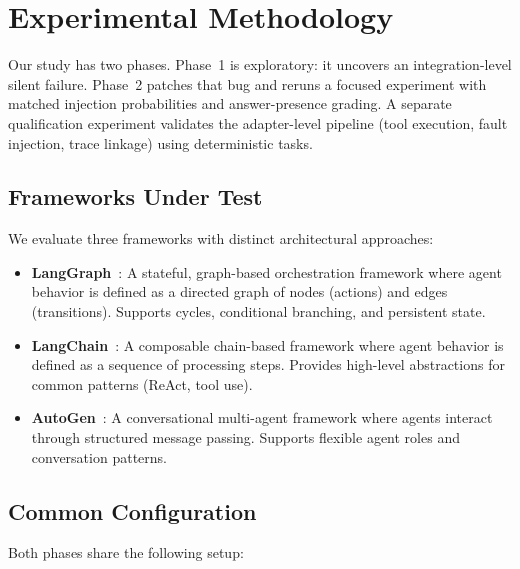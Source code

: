 \documentclass[make,article,submit,moreauthors,pdftex]{mdpi}
\begin{document}
\section{Experimental Methodology}\label{sec:experiments}

Our study has two phases. Phase~1 is exploratory: it uncovers an integration-level silent failure. Phase~2 patches that bug and reruns a focused experiment with matched injection probabilities and answer-presence grading. A separate qualification experiment validates the adapter-level pipeline (tool execution, fault injection, trace linkage) using deterministic tasks.

\subsection{Frameworks Under Test}

We evaluate three frameworks with distinct architectural approaches:

\begin{itemize}
  \item \textbf{LangGraph}~\cite{langgraph2024}: A stateful, graph-based orchestration framework where agent behavior is defined as a directed graph of nodes (actions) and edges (transitions). Supports cycles, conditional branching, and persistent state.

  \item \textbf{LangChain}~\cite{langchain2023}: A composable chain-based framework where agent behavior is defined as a sequence of processing steps. Provides high-level abstractions for common patterns (ReAct, tool use).

  \item \textbf{AutoGen}~\cite{wu2023autogen}: A conversational multi-agent framework where agents interact through structured message passing. Supports flexible agent roles and conversation patterns.
\end{itemize}

\subsection{Common Configuration}

Both phases share the following setup:
\end{document}
